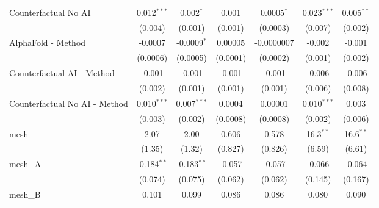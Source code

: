 \begin{tabular}{lcccccc}
   Counterfactual No AI                                        & 0.012$^{***}$ & 0.002$^{*}$    & 0.001         & 0.0005$^{*}$   & 0.023$^{***}$ & 0.005$^{**}$\\   
                                                               & (0.004)       & (0.001)        & (0.001)       & (0.0003)       & (0.007)       & (0.002)\\   
   AlphaFold - Method                                          & -0.0007       & -0.0009$^{*}$  & 0.00005       & -0.0000007     & -0.002        & -0.001\\   
                                                               & (0.0006)      & (0.0005)       & (0.0001)      & (0.0002)       & (0.001)       & (0.002)\\   
   Counterfactual AI - Method                                  & -0.001        & -0.001         & -0.001        & -0.001         & -0.006        & -0.006\\   
                                                               & (0.002)       & (0.001)        & (0.001)       & (0.001)        & (0.006)       & (0.008)\\   
   Counterfactual No AI - Method                               & 0.010$^{***}$ & 0.007$^{***}$  & 0.0004        & 0.00001        & 0.010$^{***}$ & 0.003\\   
                                                               & (0.003)       & (0.002)        & (0.0008)      & (0.0008)       & (0.002)       & (0.006)\\   
   mesh\_                                                      & 2.07          & 2.00           & 0.606         & 0.578          & 16.3$^{**}$   & 16.6$^{**}$\\   
                                                               & (1.35)        & (1.32)         & (0.827)       & (0.826)        & (6.59)        & (6.61)\\   
   mesh\_A                                                     & -0.184$^{**}$ & -0.183$^{**}$  & -0.057        & -0.057         & -0.066        & -0.064\\   
                                                               & (0.074)       & (0.075)        & (0.062)       & (0.062)        & (0.145)       & (0.167)\\   
   mesh\_B                                                     & 0.101         & 0.099          & 0.086         & 0.086          & 0.080         & 0.090\\   

\end{tabular}
